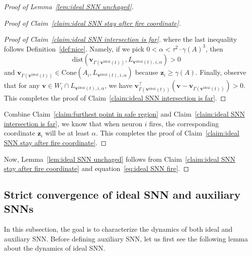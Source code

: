 \documentclass[11pt]{article}
\theoremstyle{remark}
\theoremstyle{definition}
\newcommand{\bz}{\mathbf{z}}
\newcommand{\bv}{\mathbf{v}}
\begin{document}
\begin{proof}[Proof of Lemma~\ref{lem:ideal SNN unchaged}]
\begin{proof}[Proof of Claim~\ref{claim:ideal SNN stay after fire coordinate}]
\begin{proof}[Proof of Claim~\ref{claim:ideal SNN intersection is far}]
			where the last inequality follows Definition~\ref{def:nice}. Namely, if we pick $0<\alpha<\tau^2\cdot\gamma(A)^3$, then
			\begin{equation*}
			\text{dist}\left(\bv_{\Gamma(\bv^\text{ideal}(t))},L_{\bv^\text{ideal}(t),i,\alpha}\right)>0
			\end{equation*}
			and $\bv_{\Gamma(\bv^\text{ideal}(t))}\in\text{Cone}(A_i,L_{\bv^\text{ideal}(t),i,\alpha})$ because $\bz_i\geq\gamma(A)$. Finally, observe that for any $\bv\in W_i\cap L_{\bv^\text{ideal}(t),i,\alpha}$, we have $\bv_{\Gamma(\bv^\text{ideal}(t))}^\top\left(\bv-\bv_{\Gamma(\bv^\text{ideal}(t))}\right)>0$. This completes the proof of Claim~\ref{claim:ideal SNN intersection is far}.
		\end{proof}
		Combine Claim~\ref{claim:furthest point in safe region} and Claim~\ref{claim:ideal SNN intersection is far}, we know that when neuron $i$ fires, the corresponding coordinate $\bz_i$ will be at least $\alpha$. This completes the proof of Claim~\ref{claim:ideal SNN stay after fire coordinate}.
	\end{proof}
	Now, Lemma~\ref{lem:ideal SNN unchaged} follows from Claim~\ref{claim:ideal SNN stay after fire coordinate} and equation~\eqref{eq:ideal SNN fire}.
\end{proof}

\subsection{Strict convergence of ideal SNN and auxiliary SNNs}\label{sec:strict}
In this subsection, the goal is to characterize the dynamics of both ideal and auxiliary SNN. Before defining auxiliary SNN, let us first see the following lemma about the dynamics of ideal SNN. 
\end{document}

